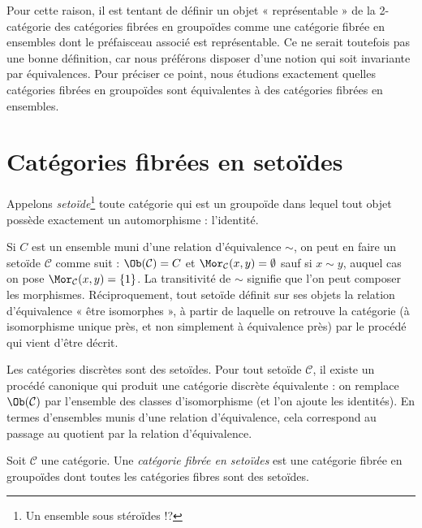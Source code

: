 \noindent
Pour cette raison, il est tentant de définir un objet « représentable » de la
2-catégorie des catégories fibrées en groupoïdes comme une catégorie fibrée en
ensembles dont le préfaisceau associé est représentable. Ce ne serait toutefois
pas une bonne définition, car nous préférons disposer d'une notion qui soit
invariante par équivalences. Pour préciser ce point, nous étudions exactement
quelles catégories fibrées en groupoïdes sont équivalentes à des catégories
fibrées en ensembles.








\section{Catégories fibrées en setoïdes}
\label{section-fibred-in-setoids}

\begin{definition}
\label{definition-setoid}
Appelons {\it setoïde}\footnote{Un ensemble sous stéroïdes !?} toute catégorie
qui est un groupoïde dans lequel tout objet
possède exactement un automorphisme : l'identité.
\end{definition}

\noindent
Si $C$ est un ensemble muni d'une relation d'équivalence $\sim$, on peut en faire
un setoïde $\mathcal{C}$ comme suit : $\Ob(\mathcal{C}) = C$ et
$\Mor_\mathcal{C}(x, y) = \emptyset$ sauf si $x \sim y$, auquel
cas on pose $\Mor_\mathcal{C}(x, y) = \{1\}$. La transitivité de
$\sim$ signifie que l'on peut composer les morphismes. Réciproquement, tout
setoïde définit sur ses objets la relation d'équivalence « être isomorphes »,
à partir de laquelle on retrouve la catégorie (à isomorphisme
unique près, et non simplement à équivalence près) par le procédé qui vient d'être décrit.

\medskip\noindent
Les catégories discrètes sont des setoïdes. Pour tout setoïde $\mathcal{C}$,
il existe un procédé canonique qui produit une catégorie
discrète équivalente : on remplace $\Ob(\mathcal{C})$ par l'ensemble des classes
d'isomorphisme (et l'on ajoute les identités). En termes d'ensembles
munis d'une relation d'équivalence, cela correspond au passage au quotient
par la relation d'équivalence.

\begin{definition}
\label{definition-category-fibred-setoids}
Soit $\mathcal{C}$ une catégorie. Une {\it catégorie fibrée en setoïdes} est
une catégorie fibrée en groupoïdes dont toutes les catégories fibres sont des
setoïdes.
\end{definition}


